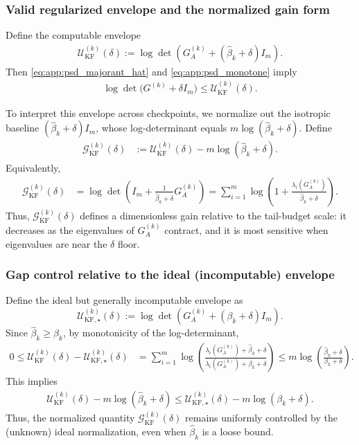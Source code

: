 \documentclass{article}
\theoremstyle{plain}
\theoremstyle{definition}
\theoremstyle{remark}
\begin{document}
\subsubsection{Valid regularized envelope and the normalized gain form}
Define the computable envelope
\begin{align}
\mathcal{U}_{\mathrm{KF}}^{(k)}(\delta)
:=
\log\det\!\left(G_A^{(k)}+(\widehat{\beta}_k+\delta)I_m\right).
\label{eq:app:kf_envelope_valid}
\end{align}
Then \eqref{eq:app:psd_majorant_hat} and \eqref{eq:app:psd_monotone} imply
\begin{align}
\log\det\!\big(G^{(k)}+\delta I_m\big)\le \mathcal{U}_{\mathrm{KF}}^{(k)}(\delta).
\end{align}

To interpret this envelope across checkpoints, we normalize out the isotropic baseline
$(\widehat{\beta}_k+\delta)I_m$, whose log-determinant equals $m\log(\widehat{\beta}_k+\delta)$. Define 
\begin{align}
\mathcal{G}_{\mathrm{KF}}^{(k)}(\delta)
&:= \mathcal{U}_{\mathrm{KF}}^{(k)}(\delta)-m\log(\widehat{\beta}_k+\delta).
\label{eq:app:gkf_def}
\end{align}
Equivalently,
\begin{align}
\mathcal{G}_{\mathrm{KF}}^{(k)}(\delta)
&=
\log\det\!\left(I_m+\frac{1}{\widehat{\beta}_k+\delta}G_A^{(k)}\right)
=
\sum_{i=1}^m \log\!\left(1+\frac{\lambda_i(G_A^{(k)})}{\widehat{\beta}_k+\delta}\right).
\label{eq:app:gkf_eigform}
\end{align}
Thus, $\mathcal{G}_{\mathrm{KF}}^{(k)}(\delta)$ defines a dimensionless gain relative to the tail-budget scale: it
decreases as the eigenvalues of $G_A^{(k)}$ contract, and it is most sensitive when eigenvalues are near the $\delta$ floor.

\subsubsection{Gap control relative to the ideal (incomputable) envelope}
Define the ideal but generally incomputable envelope as
\[
\mathcal{U}^{(k)}_{\mathrm{KF},\star}(\delta)
:=\log\det\!\left(G_A^{(k)}+(\beta_k+\delta)I_m\right).
\]
Since $\widehat{\beta}_k\ge \beta_k$, by monotonicity of the log-determinant,
\begin{align}
0 \le \mathcal{U}_{\mathrm{KF}}^{(k)}(\delta)-\mathcal{U}^{(k)}_{\mathrm{KF},\star}(\delta)
&= \sum_{i=1}^m
\log\!\left(
\frac{\lambda_i(G_A^{(k)})+\widehat{\beta}_k+\delta}
{\lambda_i(G_A^{(k)})+\beta_k+\delta}
\right)
\le m\log\!\left(\frac{\widehat{\beta}_k+\delta}{\beta_k+\delta}\right).
\label{eq:app:kf_gap_bound}
\end{align}
This implies
\begin{align}
\mathcal{U}_{\mathrm{KF}}^{(k)}(\delta)-m\log(\widehat{\beta}_k+\delta)
\le
\mathcal{U}^{(k)}_{\mathrm{KF},\star}(\delta)-m\log(\beta_k+\delta).
\label{eq:app:normalization_control}
\end{align}
Thus, the normalized quantity $\mathcal{G}_{\mathrm{KF}}^{(k)}(\delta)$ remains uniformly controlled by the
(unknown) ideal normalization, even when $\widehat{\beta}_k$ is a loose bound.
\end{document}
